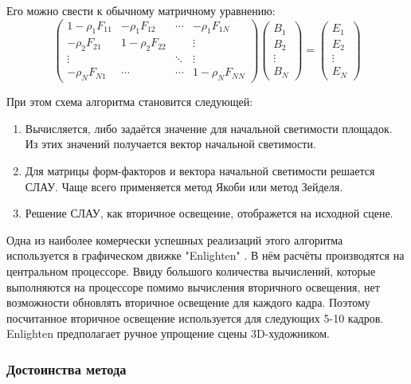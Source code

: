 \documentclass[12pt,fleqn]{article}
\begin{document}
Его можно свести к обычному матричному уравнению:
\begin{equation*}
\begin{pmatrix}
1 - \rho_1 F_{11} & -\rho_1 F_{12} & \cdots & -\rho_1 F_{1N} \\
-\rho_2 F_{21} & 1 - \rho_2 F_{22} & & \vdots \\
\vdots & & \ddots & \vdots \\
-\rho_N F_{N1} & \cdots & \cdots & 1 - \rho_N F_{NN}
\end{pmatrix}
\begin{pmatrix}
B_1 \\
B_2 \\
\vdots \\
B_N
\end{pmatrix}
=
\begin{pmatrix}
E_1 \\
E_2 \\
\vdots \\
E_N
\end{pmatrix}
\end{equation*}

При этом схема алгоритма становится следующей: 

\begin{enumerate}

\item Вычисляется, либо задаётся значение для начальной светимости площадок. Из этих значений получается вектор начальной светимости.

\item Для матрицы форм-факторов и вектора начальной светимости решается СЛАУ. Чаще всего применяется метод Якоби или метод Зейделя.

\item Решение СЛАУ, как вторичное освещение, отображется на исходной сцене.

\end{enumerate}

Одна из наиболее комерчески успешных реализаций этого алгоритма используется в графическом движке "Enlighten" \cite{Enlighten}. В нём расчёты производятся на центральном процессоре. Ввиду большого количества вычислений, которые выполняются на процессоре помимо вычисления вторичного освещения, нет возможности обновлять вторичное освещение для каждого кадра. Поэтому посчитанное вторичное освещение используется для следующих 5-10 кадров. Enlighten предполагает ручное упрощение сцены 3D-художником.

\subsubsection{Достоинства метода}
\end{document}
